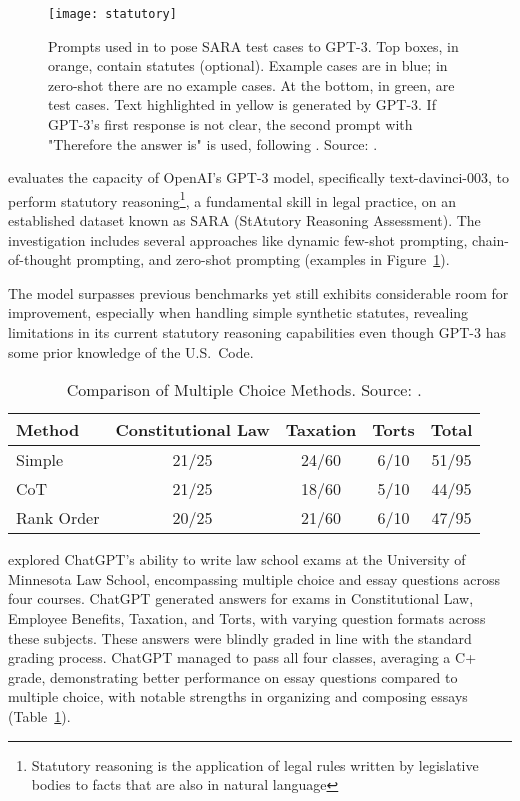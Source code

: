 \begin{figure}[!h]
	\centering
	\texttt{[image: statutory]}
	\caption{Prompts used in \protect\textcite{blairstanek2023gpt3statutory} to pose SARA test cases to GPT-3. Top boxes, in orange, contain statutes (optional). Example cases are in blue; in zero-shot there are no example cases. At the bottom, in green, are test cases. Text highlighted in yellow is generated by GPT-3. If GPT-3’s first response is not clear, the second prompt with "Therefore the answer is" is used, following \protect\textcite{kojima2023large}. Source: \protect\textcite{trautmann2022legalprompt}.}
	\label{fig:legal_prompting}
\end{figure}


\textcite{blairstanek2023gpt3statutory} evaluates the capacity of OpenAI's GPT-3 model, specifically text-davinci-003, to perform statutory reasoning\footnote{Statutory reasoning is the application of legal rules written by legislative bodies to facts that are also in natural language}, a fundamental skill in legal practice, on an established dataset known as SARA (StAtutory Reasoning Assessment).
The investigation includes several approaches like dynamic few-shot prompting, chain-of-thought prompting, and zero-shot prompting (examples in Figure~\ref{fig:legal_prompting}).

The model surpasses previous benchmarks yet still exhibits considerable room for improvement, especially when handling simple synthetic statutes, revealing limitations in its current statutory reasoning capabilities even though GPT-3 has some prior knowledge of the U.S.\ Code.

\begin{table}[!h]
	\centering
	\begin{tabularx}{\textwidth}{Xcccc}
		\toprule
		Method     & Constitutional Law & Taxation & Torts & Total \\
		\midrule
		Simple     & 21/25              & 24/60    & 6/10  & 51/95 \\
		CoT        & 21/25              & 18/60    & 5/10  & 44/95 \\
		Rank Order & 20/25              & 21/60    & 6/10  & 47/95 \\
		\bottomrule
	\end{tabularx}
	\caption{Comparison of Multiple Choice Methods. Source: \protect\textcite{choi2023chatgptlaw}.}
	\label{tab:mc_comparison}
\end{table}

\textcite{choi2023chatgptlaw} explored ChatGPT's ability to write law school exams at the University of Minnesota Law School, encompassing multiple choice and essay questions across four courses.
ChatGPT generated answers for exams in Constitutional Law, Employee Benefits, Taxation, and Torts, with varying question formats across these subjects.
These answers were blindly graded in line with the standard grading process.
ChatGPT managed to pass all four classes, averaging a C+ grade, demonstrating better performance on essay questions compared to multiple choice, with notable strengths in organizing and composing essays (Table~\ref{tab:mc_comparison}).

